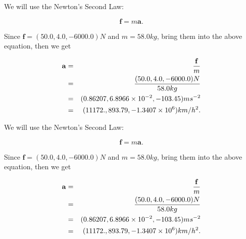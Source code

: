 \documentclass[12pt]{article}
\begin{document}
 
 
 
\noindent{}
 
 

We will use the Newton's Second Law:
 
\[
\mathbf{f}=m\mathbf{a}.
\]
 
Since $\mathbf{f}=( %
50.0,  %
4.0,  %
-6000.0 )N$
and $m= %
58.0 kg$, bring them into the above equation, then we get
 
\begin{eqnarray*}
\mathbf{a}&=&\frac{\mathbf{f}}m  \\
&=&\frac{(
50.0 ,
4.0 ,
-6000.0 )N
}{ %
58.0 kg}  \\
&=&(
0.86207 ,
6.8966 \times 10^{-2},
-103.45
)ms^{-2} \\
&=&(
11172. ,
893.79 ,
-1.3407 \times 10^{6}
)km/h^2.
\end{eqnarray*}
 
 
 
\noindent{}
 
 

 
 
 
\noindent{}
 
 

We will use the Newton's Second Law:
 
\[
\mathbf{f}=m\mathbf{a}.
\]
 
Since $\mathbf{f}=( %
50.0,  %
4.0,  %
-6000.0 )N$
and $m= %
58.0 kg$, bring them into the above equation, then we get
 
\begin{eqnarray*}
\mathbf{a}&=&\frac{\mathbf{f}}m  \\
&=&\frac{(
50.0 ,
4.0 ,
-6000.0 )N
}{ %
58.0 kg}  \\
&=&(
0.86207 ,
6.8966 \times 10^{-2},
-103.45
)ms^{-2} \\
&=&(
11172. ,
893.79 ,
-1.3407 \times 10^{6}
)km/h^2.
\end{eqnarray*}
 
 
 
\noindent{}
 
 

 
\vspace{0.3in}
   
   
   
\end{document}
